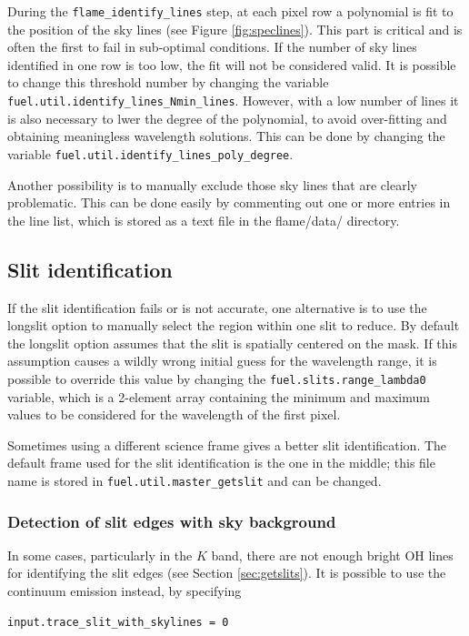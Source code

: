 \documentclass[a4paper, notitlepage]{article}
\begin{document}
During the \texttt{flame\_identify\_lines} step, at each pixel row a polynomial is fit to the position of the sky lines (see Figure \ref{fig:speclines}). This part is critical and is often the first to fail in sub-optimal conditions. If the number of sky lines identified in one row is too low, the fit will not be considered valid. It is possible to change this threshold number by changing the variable \texttt{fuel.util.identify\_lines\_Nmin\_lines}. However, with a low number of lines it is also necessary to lwer the degree of the polynomial, to avoid over-fitting and obtaining meaningless wavelength solutions. This can be done by changing the variable \texttt{fuel.util.identify\_lines\_poly\_degree}.

Another possibility is to manually exclude those sky lines that are clearly problematic. This can be done easily by commenting out one or more entries in the line list, which is stored as a text file in the flame/data/ directory.


\subsection{Slit identification}

If the slit identification fails or is not accurate, one alternative is to use the longslit option to manually select the region within one slit to reduce. By default the longslit option assumes that the slit is spatially centered on the mask. If this assumption causes a wildly wrong initial guess for the wavelength range, it is possible to override this value by changing the \texttt{fuel.slits.range\_lambda0} variable, which is a 2-element array containing the minimum and maximum values to be considered for the wavelength of the first pixel.

Sometimes using a different science frame gives a better slit identification. The default frame used for the slit identification is the one in the middle; this file name is stored in \texttt{fuel.util.master\_getslit} and can be changed.


\subsubsection{Detection of slit edges with sky background}
\label{sec:use_sky_edge}

In some cases, particularly in the $K$ band, there are not enough bright OH lines for identifying the slit edges (see Section \ref{sec:getslits}). It is possible to use the continuum emission instead, by specifying
\begin{lstlisting}
input.trace_slit_with_skylines = 0
\end{lstlisting}
\end{document}
